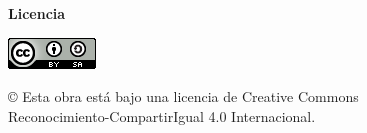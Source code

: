 \documentclass[spanish,a4paper,11pt,oneside]{extreport}
\begin{document}
\newpage
\thispagestyle{empty}
\vspace*{\fill}
\begin{center}
\end{center}
\vspace*{\fill}
\newpage


\newpage
\thispagestyle{empty}

\bigskip
\begin{center}
  \begin{LARGE}
    \textbf{Licencia}
  \end{LARGE}
\end{center}

\bigskip
\bigskip
\bigskip

\begin{center}
	\includegraphics[scale=1.8]{images/by-sa_88x31}\\[5mm]
\end{center}

\begin{center}
	© Esta obra está bajo una licencia de Creative Commons \\
	Reconocimiento-CompartirIgual 4.0 Internacional.
\end{center}


\newpage
\thispagestyle{empty}
\vspace*{\fill}
\begin{center}
\end{center}
\vspace*{\fill}
\newpage

\newpage
\thispagestyle{empty}



\end{document}
